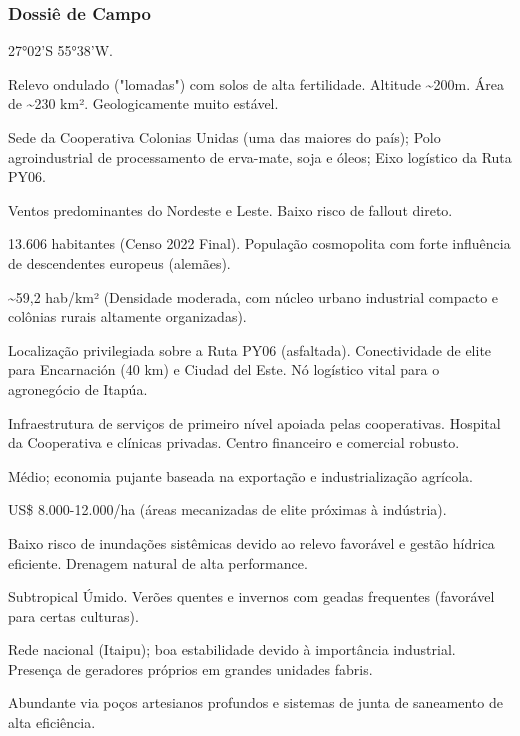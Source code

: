 \subsubsection{Dossiê de Campo}
\begin{description}[style=nextline,leftmargin=0.5cm,font=\bfseries]
\item[Coordenadas]  27°02'S 55°38'W.
\item[Topografia]  Relevo ondulado ("lomadas") com solos de alta fertilidade. Altitude \textasciitilde 200m. Área de \textasciitilde 230 km². Geologicamente muito estável.
\item[Alvos Estratégicos]  Sede da Cooperativa Colonias Unidas (uma das maiores do país); Polo agroindustrial de processamento de erva-mate, soja e óleos; Eixo logístico da Ruta PY06.
\item[Fallout]  Ventos predominantes do Nordeste e Leste. Baixo risco de fallout direto.
\item[População]  13.606 habitantes (Censo 2022 Final). População cosmopolita com forte influência de descendentes europeus (alemães).
\item[Densidade]  \textasciitilde 59,2 hab/\allowbreak km² (Densidade moderada, com núcleo urbano industrial compacto e colônias rurais altamente organizadas).
\item[Vias de Acesso]  Localização privilegiada sobre a Ruta PY06 (asfaltada). Conectividade de elite para Encarnación (40 km) e Ciudad del Este. Nó logístico vital para o agronegócio de Itapúa.
\item[Serviços]  Infraestrutura de serviços de primeiro nível apoiada pelas cooperativas. Hospital da Cooperativa e clínicas privadas. Centro financeiro e comercial robusto.
\item[Custo de Vida]  Médio; economia pujante baseada na exportação e industrialização agrícola.
\item[Preço da Terra]  US\$ 8.000-12.000/\allowbreak ha (áreas mecanizadas de elite próximas à indústria).
\item[Hidrologia]  Baixo risco de inundações sistêmicas devido ao relevo favorável e gestão hídrica eficiente. Drenagem natural de alta performance.
\item[Clima]  Subtropical Úmido. Verões quentes e invernos com geadas frequentes (favorável para certas culturas).
\item[Energia]  Rede nacional (Itaipu); boa estabilidade devido à importância industrial. Presença de geradores próprios em grandes unidades fabris.
\item[Água]  Abundante via poços artesianos profundos e sistemas de junta de saneamento de alta eficiência.

\end{description}
